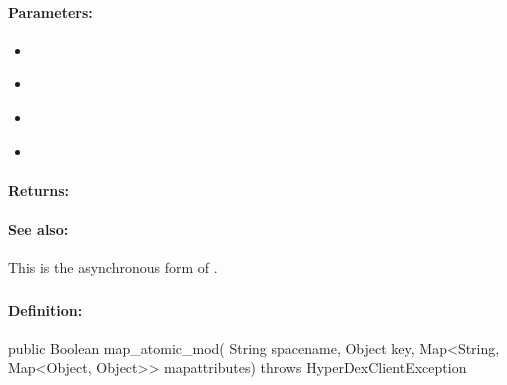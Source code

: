 \paragraph{Parameters:}
\begin{itemize}[noitemsep]
\item {}\\

\item {}\\

\item {}\\

\item {}\\

\end{itemize}

\paragraph{Returns:}


\paragraph{See also:}  This is the asynchronous form of .

\pagebreak
\subsubsection{}
\label{api:java:map_atomic_mod}


\paragraph{Definition:}
\begin{javacode}
public Boolean map_atomic_mod(
        String spacename,
        Object key,
        Map<String, Map<Object, Object>> mapattributes) throws HyperDexClientException
\end{javacode}


